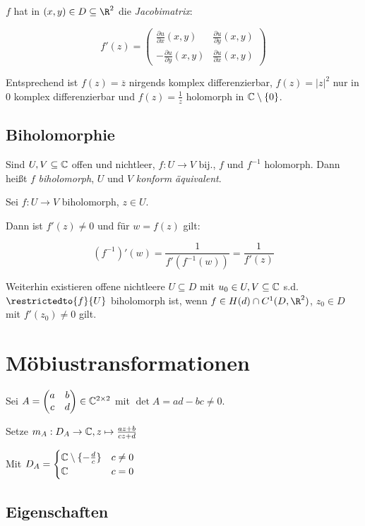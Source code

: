 $f$ hat in $(x,y) \in D \subseteq \R^2$ die \emph{Jacobimatrix}:

$$f'(z) = \begin{pmatrix}
	\frac{\partial u}{\partial x}(x,y) & \frac{\partial u}{\partial y}(x,y) \\
	-\frac{\partial u}{\partial y}(x,y) & \frac{\partial u}{\partial x}(x,y)
\end{pmatrix}$$

Entsprechend ist $f(z)=\overline z$ nirgends komplex differenzierbar, $f(z)=|z|^2$ nur in $0$ komplex differenzierbar und $f(z) = \frac{1}{z}$ holomorph in $\mathbb{C} \setminus \{0\}$.

\subsection*{Biholomorphie}

Sind $U, V \subseteq \mathbb{C}$ offen und nichtleer, $f : U \to V$ bij., $f$ und $f^{-1}$ holomorph. Dann heißt $f$ \emph{biholomorph}, $U$ und $V$ \emph{konform äquivalent}.

Sei $f : U \to V$ biholomorph, $z \in U$.

Dann ist $f'(z) \neq 0$ und für $w = f(z)$ gilt:

\vspace*{-2mm}
$$(f^{-1})'(w) = \frac{1}{f'(f^{-1}(w))} = \frac{1}{f'(z)}$$

Weiterhin existieren offene nichtleere $U \subseteq D$ mit $u_0 \in U, V \subseteq \mathbb{C}$ s.d. $\restrictedto{f}{U}$ biholomorph ist, wenn $f \in H(d) \cap C^1(D,\R^2)$, $z_0 \in D$ mit $f'(z_0) \neq 0$ gilt.

\section*{Möbiustransformationen}

Sei $A = \begin{pmatrix} a & b \\ c & d\end{pmatrix} \in \mathbb{C}^{2 \times 2}$ mit $\det A = ad - bc \neq 0$.

Setze $m_A : D_A \to \mathbb{C}, z \mapsto \frac{az+b}{cz+d}$

Mit $D_A = \begin{cases} \mathbb{C} \setminus \{-\frac{d}{c}\} & c \neq 0 \\ \mathbb{C} & c = 0\end{cases}$

\subsection*{Eigenschaften}

